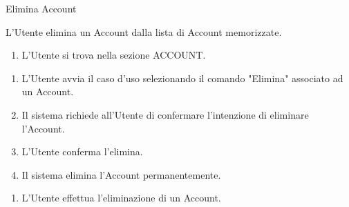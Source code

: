 {\ucExtTable	%
{	%
	Elimina Account
	
}{	%
	
}{	%
	L'Utente elimina un Account dalla lista di Account memorizzate.
	
}{	%
	\attori
	
}{	%
	\begin{enumerate}
        \item L'Utente si trova nella sezione ACCOUNT.
    \end{enumerate}
	
}{	%
	\begin{enumerate}
        \item L'Utente avvia il caso d'uso selezionando il comando "Elimina" associato ad un Account.
        \item Il sistema richiede all'Utente di confermare l'intenzione di eliminare l'Account.
        \item L'Utente conferma l'elimina.
        \item Il sistema elimina l'Account permanentemente.
    \end{enumerate}
	
}{	%
	\begin{enumerate}
        \item L'Utente effettua l'eliminazione di un Account.
    \end{enumerate}
	
} }